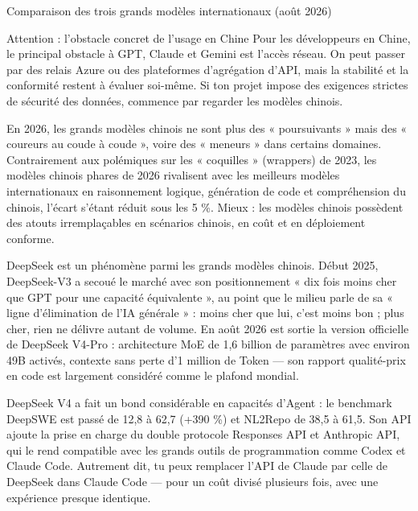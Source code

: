 \begin{center}\small\color{gray}Comparaison des trois grands modèles internationaux (août 2026)\end{center}

\begin{tcbwarn}{Attention : l'obstacle concret de l'usage en Chine}
Pour les développeurs en Chine, le principal obstacle à GPT, Claude et Gemini est l'accès réseau. On peut passer par des relais Azure ou des plateformes d'agrégation d'API, mais la stabilité et la conformité restent à évaluer soi-même. Si ton projet impose des exigences strictes de sécurité des données, commence par regarder les modèles chinois.

\end{tcbwarn}


En 2026, les grands modèles chinois ne sont plus des « poursuivants » mais des « coureurs au coude à coude », voire des « meneurs » dans certains domaines. Contrairement aux polémiques sur les « coquilles » (wrappers) de 2023, les modèles chinois phares de 2026 rivalisent avec les meilleurs modèles internationaux en raisonnement logique, génération de code et compréhension du chinois, l'écart s'étant réduit sous les 5 \%. Mieux : les modèles chinois possèdent des atouts irremplaçables en scénarios chinois, en coût et en déploiement conforme.


DeepSeek est un phénomène parmi les grands modèles chinois. Début 2025, DeepSeek-V3 a secoué le marché avec son positionnement « dix fois moins cher que GPT pour une capacité équivalente », au point que le milieu parle de sa « ligne d'élimination de l'IA générale » : moins cher que lui, c'est moins bon ; plus cher, rien ne délivre autant de volume. En août 2026 est sortie la version officielle de DeepSeek V4-Pro : architecture MoE de 1,6 billion de paramètres avec environ 49B activés, contexte sans perte d'1 million de Token — son rapport qualité-prix en code est largement considéré comme le plafond mondial.

DeepSeek V4 a fait un bond considérable en capacités d'Agent : le benchmark DeepSWE est passé de 12,8 à 62,7 (+390 \%) et NL2Repo de 38,5 à 61,5. Son API ajoute la prise en charge du double protocole Responses API et Anthropic API, qui le rend compatible avec les grands outils de programmation comme Codex et Claude Code. Autrement dit, tu peux remplacer l'API de Claude par celle de DeepSeek dans Claude Code — pour un coût divisé plusieurs fois, avec une expérience presque identique.

